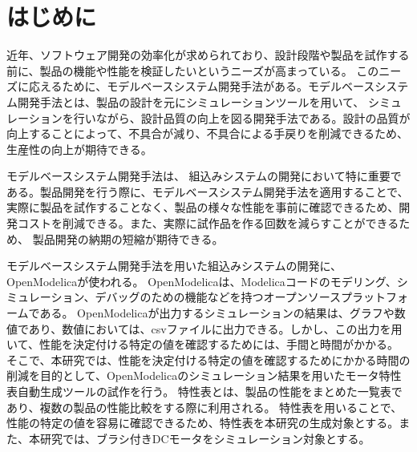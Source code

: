 \chapter{はじめに}\label{cha:Introduction}
近年、ソフトウェア開発の効率化が求められており、設計段階や製品を試作する前に、製品の機能や性能を検証したいというニーズが高まっている\cite{modelicaモデルベース本}。
このニーズに応えるために、モデルベースシステム開発手法がある\cite{modelicaモデルベース本}。モデルベースシステム開発手法とは、製品の設計を元にシミュレーションツールを用いて、
シミュレーションを行いながら、設計品質の向上を図る開発手法である\cite{ipa_2016}。設計の品質が向上することによって、不具合が減り、不具合による手戻りを削減できるため、生産性の向上が期待できる\cite{ipa_2016}。

モデルベースシステム開発手法は、 組込みシステムの開発において特に重要である\cite{ipa_useful_modelbase_dev}。製品開発を行う際に、モデルベースシステム開発手法を適用することで、
実際に製品を試作することなく、製品の様々な性能を事前に確認できるため、開発コストを削減できる\cite{modelicaモデルベース本}。また、実際に試作品を作る回数を減らすことができるため、
製品開発の納期の短縮が期待できる。

モデルベースシステム開発手法を用いた組込みシステムの開発に、OpenModelica\cite{open_modelica}が使われる。
OpenModelicaは、Modelica\cite{modelicaモデルベース本}コードのモデリング、シミュレーション、デバッグのための機能などを持つオープンソースプラットフォームである。
OpenModelicaが出力するシミュレーションの結果は、グラフや数値であり、数値においては、csvファイルに出力できる。しかし、この出力を用いて、性能を決定付ける特定の値を確認するためには、手間と時間がかかる。
そこで、本研究では、性能を決定付ける特定の値を確認するためにかかる時間の削減を目的として、OpenModelicaのシミュレーション結果を用いたモータ特性表自動生成ツールの試作を行う。
特性表とは、製品の性能をまとめた一覧表であり、複数の製品の性能比較をする際に利用される\cite{特性表1,特性表2,特性表3,特性表4,特性表5,特性表6,特性表7,特性表8,特性表9,特性表10}。
特性表を用いることで、性能の特定の値を容易に確認できるため、特性表を本研究の生成対象とする。また、本研究では、ブラシ付きDCモータ\cite{モータ使う}をシミュレーション対象とする。



